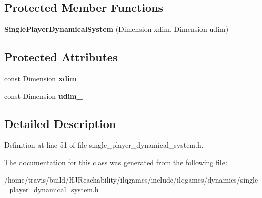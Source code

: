 \subsection*{Protected Member Functions}
\begin{DoxyCompactItemize}
\item 
{\bfseries Single\+Player\+Dynamical\+System} (Dimension xdim, Dimension udim)\hypertarget{classilqgames_1_1_single_player_dynamical_system_aa83761473fdd007d641ff7a29e7c4fe1}{}\label{classilqgames_1_1_single_player_dynamical_system_aa83761473fdd007d641ff7a29e7c4fe1}

\end{DoxyCompactItemize}
\subsection*{Protected Attributes}
\begin{DoxyCompactItemize}
\item 
const Dimension {\bfseries xdim\+\_\+}\hypertarget{classilqgames_1_1_single_player_dynamical_system_a556a93c620d076cf36acd55aff69a02f}{}\label{classilqgames_1_1_single_player_dynamical_system_a556a93c620d076cf36acd55aff69a02f}

\item 
const Dimension {\bfseries udim\+\_\+}\hypertarget{classilqgames_1_1_single_player_dynamical_system_ad7058a359156f603a03323a3abf3de39}{}\label{classilqgames_1_1_single_player_dynamical_system_ad7058a359156f603a03323a3abf3de39}

\end{DoxyCompactItemize}


\subsection{Detailed Description}


Definition at line 51 of file single\+\_\+player\+\_\+dynamical\+\_\+system.\+h.



The documentation for this class was generated from the following file\+:\begin{DoxyCompactItemize}
\item 
/home/travis/build/\+H\+J\+Reachability/ilqgames/include/ilqgames/dynamics/single\+\_\+player\+\_\+dynamical\+\_\+system.\+h\end{DoxyCompactItemize}
